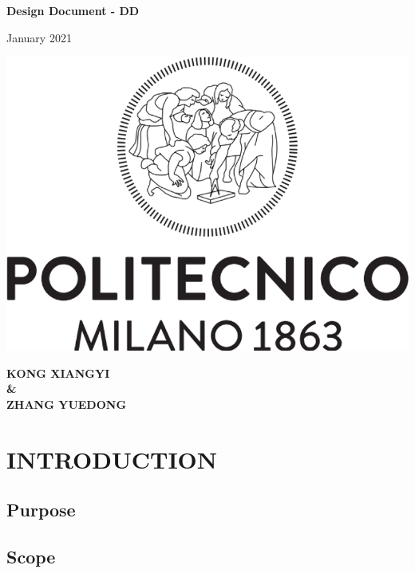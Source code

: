 \documentclass[a4paper,12pt]{report}
\begin{document}
 
	
	
\begin{titlepage}
	\begin{center}
		\vspace*{1cm}
		
		\Huge
		\textbf{Design Document - DD}
		
		\vspace{0.5cm}
		\large
		January 2021
		
		\vspace{1.5cm}
		
		
		\vfill
		
		\includegraphics[scale=0.7]{PolimiLogo}
		
		\vfill
		
		
		\normalsize
		\textbf{KONG XIANGYI} \\
		\textbf{\&} \\
		\textbf{ZHANG YUEDONG}
		
	\end{center}
\end{titlepage}

\tableofcontents


\chapter{INTRODUCTION}
\section{Purpose}
\section{Scope}
\end{document}
